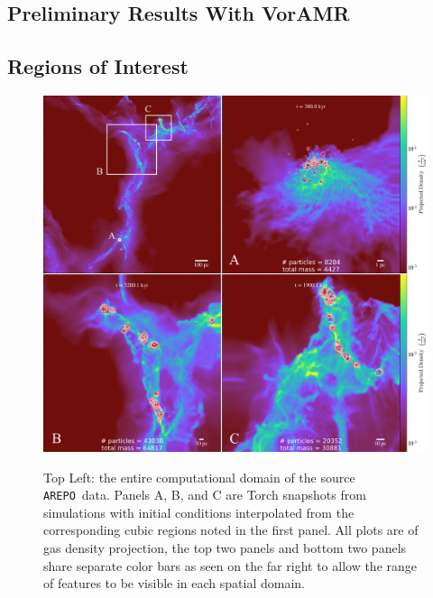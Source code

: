 \documentclass[twoside]{drexel-thesis}
\newcommand\arepo{\texttt{AREPO}}
\begin{document}
\begin{thesis}
\chapter{Preliminary Results With VorAMR}\label{chp:Paper3}
\section{Regions of Interest}

\begin{figure}
    \includegraphics[width=\linewidth]{roi-full-grid.png}\\
	\centering
    \caption{Top Left: the entire computational domain of the source \arepo~data. Panels A, B, and C are Torch snapshots from simulations with initial conditions interpolated from the corresponding cubic regions noted in the first panel. All plots are of gas density projection, the top two panels and bottom two panels share separate color bars as seen on the far right to allow the range of features to be visible in each spatial domain.}
    \label{fig:roi_grid_plot}


\end{figure}
\end{thesis}
\end{document}
